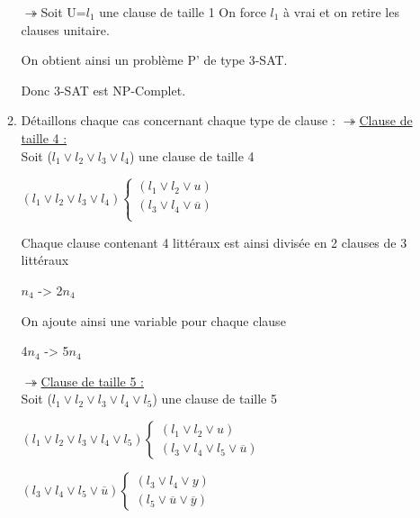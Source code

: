 \documentclass[]{article}
\begin{document}
\begin{enumerate}
\begin{enumerate}
    $\twoheadrightarrow$Soit U={$l_1$} une clause de taille 1
    On force $l_1$ à vrai et on retire les clauses unitaire.

    On obtient ainsi un problème P' de type 3-SAT.    

    Donc 3-SAT est NP-Complet.\\

    \item
      Détaillons chaque cas concernant chaque type de clause :
     $\twoheadrightarrow$\underline{Clause de taille 4 :}\\
     Soit ($l_1 \vee l_2 \vee l_3 \vee l_4$) une clause de taille 4\\

      \begin{center}
        $(l_1 \vee l_2 \vee l_3 \vee l_4)\left\lbrace 
        \begin{array}{lcl} 
          (l_1 \vee l_2 \vee u)\\ 
          (l_3 \vee l_4 \vee \overline u)\\ 
        \end{array}\right.$ 
      \end{center}

      Chaque clause contenant 4 littéraux est ainsi divisée en 2 clauses de 3 littéraux
      \begin{center}
        $n_4$ -> 2$n_4$
      \end{center}
      On ajoute ainsi une variable pour chaque clause
      \begin{center}
        4$n_4$ -> 5$n_4$
      \end{center}
      \bigbreak

      $\twoheadrightarrow$\underline{Clause de taille 5 :}\\      
      Soit ($l_1 \vee l_2 \vee l_3 \vee l_4 \vee l_5$) une clause de taille 5

      \begin{center}
     $ (l_1 \vee l_2 \vee l_3 \vee l_4 \vee l_5)\left\lbrace
      \begin{array}{lcl}
        (l_1 \vee l_2 \vee u)\\
        (l_3 \vee l_4 \vee l_5 \vee \overline u)
      \end{array}\right.$
      \end{center}

      \begin{center}
        $(l_3 \vee l_4 \vee l_5 \vee \overline u)\left\lbrace
      \begin{array}{lcl} 
        (l_3 \vee l_4 \vee y)\\
        (l_5 \vee \overline u \vee \overline y)
      \end{array}\right.$
      \end{center}


\end{enumerate}
\end{enumerate}
\end{document}
